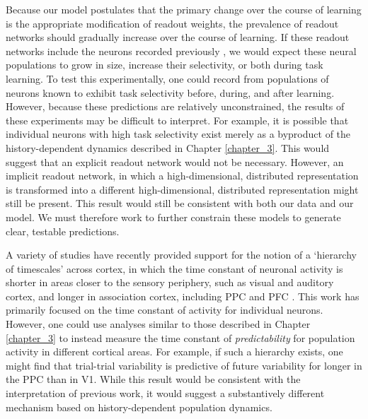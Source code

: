 \bigskip
Because our model postulates that the primary change over the course of learning is the appropriate modification of readout weights, the prevalence of readout networks should gradually increase over the course of learning. If these readout networks include the neurons recorded previously \citep{Gold:2007fo,Hanks:2015fy,Shadlen:1996ga}, we would expect these neural populations to grow in size, increase their selectivity, or both during task learning. To test this experimentally, one could record from populations of neurons known to exhibit task selectivity before, during, and after learning.  However, because these predictions are relatively unconstrained, the results of these experiments may be difficult to interpret. For example, it is possible that individual neurons with high task selectivity exist merely as a byproduct of the history-dependent dynamics described in Chapter \ref{chapter_3}. This would suggest that an explicit readout network would not be necessary. However, an implicit readout network, in which a high-dimensional, distributed representation is transformed into a different high-dimensional, distributed representation might still be present. This result would still be consistent with both our data and our model. We must therefore work to further constrain these models to generate clear, testable predictions.

\bigskip
A variety of studies have recently provided support for the notion of a `hierarchy of timescales' across cortex, in which the time constant of neuronal activity is shorter in areas closer to the sensory periphery, such as visual and auditory cortex, and longer in association cortex, including PPC and PFC \citep{Bernacchia:2011bb,Murray:2014ee,Yang:2012hw}. This work has primarily focused on the time constant of activity for individual neurons. However, one could use analyses similar to those described in Chapter \ref{chapter_3} to instead measure the time constant of \textit{predictability} for population activity in different cortical areas. For example, if such a hierarchy exists, one might find that trial-trial variability is predictive of future variability for longer in the PPC than in V1. While this result would be consistent with the interpretation of previous work, it would suggest a substantively different mechanism based on history-dependent population dynamics.

